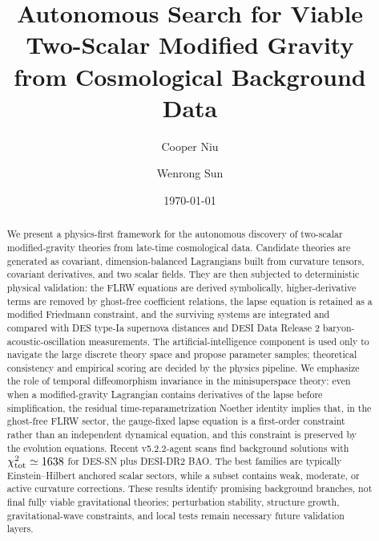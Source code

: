 \documentclass[aps,prd,twocolumn,superscriptaddress,nofootinbib,longbibliography]{revtex4-2}
\newcommand{\chiT}{\chi^2_{\rm tot}}
\begin{document}

\title{Autonomous Search for Viable Two-Scalar Modified Gravity\\
from Cosmological Background Data}

\author{Cooper Niu}

\author{Wenrong Sun}

\date{\today}

\begin{abstract}
We present a physics-first framework for the autonomous discovery of two-scalar modified-gravity theories from late-time cosmological data.  Candidate theories are generated as covariant, dimension-balanced Lagrangians built from curvature tensors, covariant derivatives, and two scalar fields.  They are then subjected to deterministic physical validation: the FLRW equations are derived symbolically, higher-derivative terms are removed by ghost-free coefficient relations, the lapse equation is retained as a modified Friedmann constraint, and the surviving systems are integrated and compared with DES type-Ia supernova distances and DESI Data Release 2 baryon-acoustic-oscillation measurements.  The artificial-intelligence component is used only to navigate the large discrete theory space and propose parameter samples; theoretical consistency and empirical scoring are decided by the physics pipeline.  We emphasize the role of temporal diffeomorphism invariance in the minisuperspace theory: even when a modified-gravity Lagrangian contains derivatives of the lapse before simplification, the residual time-reparametrization Noether identity implies that, in the ghost-free FLRW sector, the gauge-fixed lapse equation is a first-order constraint rather than an independent dynamical equation, and this constraint is preserved by the evolution equations.  Recent v5.2.2-agent scans find background solutions with $\chiT\simeq 1638$ for DES-SN plus DESI-DR2 BAO.  The best families are typically Einstein--Hilbert anchored scalar sectors, while a subset contains weak, moderate, or active curvature corrections.  These results identify promising background branches, not final fully viable gravitational theories; perturbation stability, structure growth, gravitational-wave constraints, and local tests remain necessary future validation layers.
\end{abstract}
\end{document}
